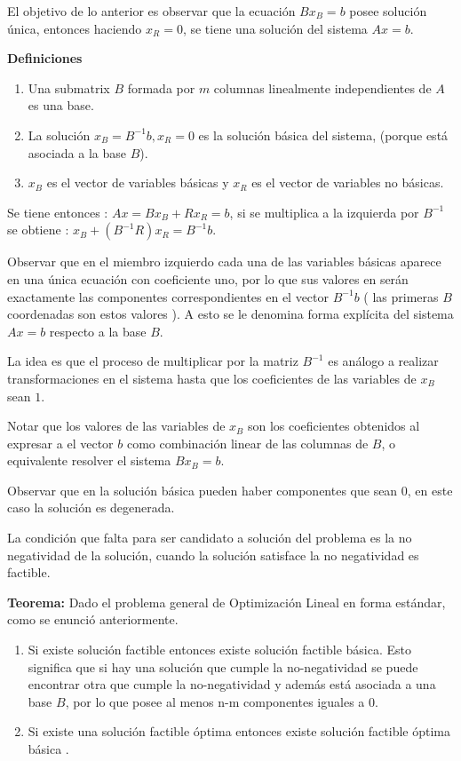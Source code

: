 \documentclass[14pt]{extarticle}
\begin{document}
El objetivo de lo anterior es observar que la ecuación $Bx_B = b$ posee solución única, entonces haciendo $x_R = 0$, se tiene una solución del sistema $Ax = b$.

\textbf{Definiciones}

\begin{enumerate}
	\item Una submatrix $B$ formada por $m$ columnas linealmente independientes de $A$ es una base.
	\item La solución $x_B = B^{-1}b, x_R = 0$ es la solución básica del sistema, (porque está asociada a la base $B$).
	\item $x_B$ es el vector de variables básicas y $x_R$ es el vector de variables no básicas.
\end{enumerate} 

Se tiene entonces : $Ax = Bx_B + Rx_R = b$, si se multiplica a la izquierda por $B^{-1}$ se obtiene : $x_B + (B^{-1}R)x_R = B^{-1}b$.

Observar que en el miembro izquierdo cada una de las variables básicas aparece en una única ecuación con coeficiente uno, por lo que sus valores en serán exactamente las componentes correspondientes en el vector $B^{-1}b$ ( las primeras $B$ coordenadas son estos valores ). A esto se le denomina forma explícita del sistema $Ax = b$ respecto a la base $B$. 

La idea es que el proceso de multiplicar por la matriz $B^{-1}$ es análogo a realizar transformaciones en el sistema hasta que los coeficientes de las variables de $x_B$ sean $1$.

Notar que los valores de las variables de $x_B$ son los coeficientes obtenidos al expresar a el vector $b$ como combinación linear de las columnas de $B$, o equivalente resolver el sistema $Bx_B = b$.

Observar que en la solución básica pueden haber componentes que sean $0$, en este caso la solución es degenerada.

La condición que falta para ser candidato a solución del problema es la no negatividad de la solución, cuando la solución satisface la no negatividad es factible.

\textbf{Teorema:} Dado el problema general de Optimización Lineal en forma estándar, como se enunció anteriormente.

\begin{enumerate}
	\item Si existe solución factible entonces existe solución factible básica. Esto significa que si hay una solución que cumple la no-negatividad se puede encontrar otra que cumple la no-negatividad y además está asociada a una base $B$, por lo que posee al menos n-m componentes iguales a $0$.

	\item Si existe una solución factible óptima entonces existe solución factible óptima básica . 
\end{enumerate}
\end{document}
